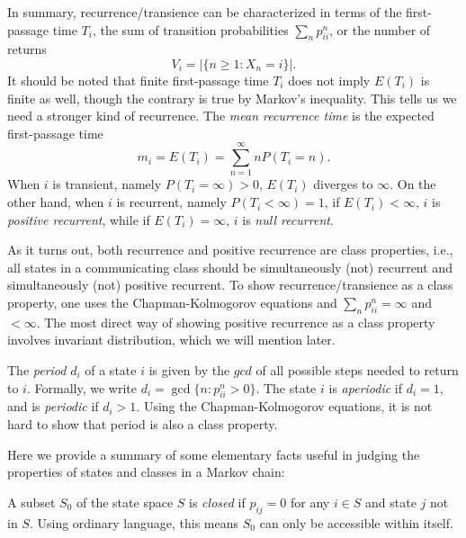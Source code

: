 \documentclass[11pt]{article}
\newcommand{\abs}[1]{\lvert #1 \rvert}
\begin{document}
In summary, recurrence/transience can be characterized in terms of the first-passage time $T_{i}$, the sum of transition probabilities $\sum_{n}p_{ii}^{n}$, or the number of returns 
\[
V_{i}=\abs{\{n\geq 1:X_{n}=i\}}.
\]
It should be noted that finite first-passage time $T_{i}$ does not imply $E(T_{i})$ is finite as well, though the contrary is true by Markov’s inequality. This tells us we need a stronger kind of recurrence. The \textit{mean recurrence time} is the expected first-passage time
\[
m_{i}=E(T_{i})=\sum_{n=1}^{\infty }nP(T_{i}=n).
\]
When $i$ is transient, namely $P(T_{i}=\infty )>0$, $E(T_{i})$ diverges to $\infty $. On the other hand, when $i$ is recurrent, namely $P(T_{i}<\infty )=1$, if $E(T_{i})<\infty $, $i$ is \textit{positive recurrent}, while if $E(T_{i})=\infty $, $i$ is \textit{null recurrent}.

As it turns out, both recurrence and positive recurrence are class properties, i.e., all states in a communicating class should be simultaneously (not) recurrent and simultaneously (not) positive recurrent. To show recurrence/transience as a class property, one uses the Chapman-Kolmogorov equations and $\sum_{n}p_{ii}^{n}=\infty $ and $<\infty $. The most direct way of showing positive recurrence as a class property involves invariant distribution, which we will mention later.

The \textit{period} $d_{i}$ of a state $i$ is given by the $gcd$ of all possible steps needed to return to $i$. Formally, we write $d_{i}=\gcd\{n:p_{ii}^{n}>0\}$. The state $i$ is \textit{aperiodic} if $d_{i}=1$, and is \textit{periodic} if $d_{i}>1$. Using the Chapman-Kolmogorov equations, it is not hard to show that period is also a class property.

Here we provide a summary of some elementary facts useful in judging the properties of states and classes in a Markov chain:

A subset $S_{0}$ of the state space $S$ is \textit{closed} if $p_{ij}=0$ for any $i\in S$ and state $j$ not in $S$. Using ordinary language, this means $S_{0}$ can only be accessible within itself.
\end{document}
